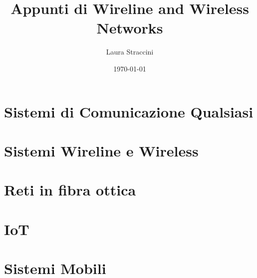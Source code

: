 \documentclass[oneside]{book}
\title{Appunti di Wireline and Wireless Networks}
\author{Laura Straccini}
\date{\today}
\begin{document}
\frontmatter
\maketitle %
\tableofcontents %

\mainmatter

\chapter{Sistemi di Comunicazione Qualsiasi}


\chapter{Sistemi Wireline e Wireless}


\chapter{Reti in fibra ottica}


\chapter{IoT}


\chapter{Sistemi Mobili}

\end{document}
